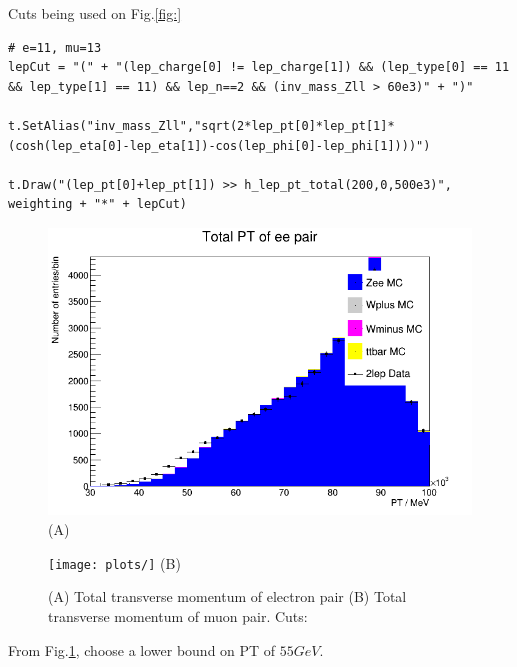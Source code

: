 Cuts being used on Fig.\ref{fig:}

\begin{lstlisting}
# e=11, mu=13
lepCut = "(" + "(lep_charge[0] != lep_charge[1]) && (lep_type[0] == 11 && lep_type[1] == 11) && lep_n==2 && (inv_mass_Zll > 60e3)" + ")"

t.SetAlias("inv_mass_Zll","sqrt(2*lep_pt[0]*lep_pt[1]*(cosh(lep_eta[0]-lep_eta[1])-cos(lep_phi[0]-lep_phi[1])))")

t.Draw("(lep_pt[0]+lep_pt[1]) >> h_lep_pt_total(200,0,500e3)", weighting + "*" + lepCut)
\end{lstlisting}

\begin{figure}[h!]
    \centering
    \begin{minipage}{0.5\textwidth}
        \centering
        \includegraphics[width=\linewidth]{plots/25-02-2021/Zee-stack-(invar-mass-lower=60GeV,2lep=e+e-)-totalPt-lower-bound-justification_25-02-21_15-04.png}
        (A)
    \end{minipage}\hfill
    \begin{minipage}{0.5\textwidth}
        \centering
        \texttt{[image: plots/]}
        (B)
    \end{minipage}
    \caption{(A) Total transverse momentum of electron pair (B) Total transverse momentum of muon pair. Cuts: }
    \label{fig:Zee-stack-(invar-mass-lower=60GeV,2lep=e+e-)-totalPt-lower-bound-justification_25-02-21}
\end{figure}

From Fig.\ref{fig:Zee-stack-(invar-mass-lower=60GeV,2lep=e+e-)-totalPt-lower-bound-justification_25-02-21}, choose a lower bound on PT of $55 GeV$.


